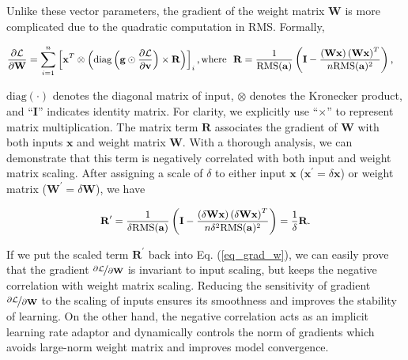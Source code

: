 Unlike these vector parameters, the gradient of the weight matrix $\mathbf{W}$ is more complicated due to the quadratic computation in RMS. Formally,

\begin{align}\label{eq_grad_w}
    \small
    \begin{split}
        & \frac{\partial \mathcal{L}}{\partial \mathbf{W}} =
        \sum_{i=1}^n \left[\mathbf{x}^T \otimes \left(\text{diag}\left(\mathbf{g} \odot \frac{\partial \mathcal{L}}{\partial \mathbf{v}} \right) \times \mathbf{R}\right)\right]_{i},  \text{where}~~ \mathbf{R} = \frac{1}{{\text{RMS}(\mathbf{a})}} \left(\mathbf{I}-\frac{\left(\mathbf{Wx}\right)\left(\mathbf{Wx}\right)^T}{n\text{RMS}(\mathbf{a})^2}\right),
    \end{split}
\end{align}

$\text{diag}(\cdot)$ denotes the diagonal matrix of input, $\otimes$ denotes the Kronecker product, and ``$\mathbf{I}$'' indicates identity matrix. For clarity, we explicitly use ``$\times$'' to represent matrix multiplication. The matrix term $\mathbf{R}$ associates the gradient of $\mathbf{W}$ with both inputs $\mathbf{x}$ and weight matrix $\mathbf{W}$. With a thorough analysis, we can demonstrate that this term is negatively correlated with both input and weight matrix scaling. After assigning a scale of $\delta$ to either input $\mathbf{x}$ ($\mathbf{x}^\prime = \delta \mathbf{x}$) or weight matrix ($\mathbf{W}^\prime = \delta \mathbf{W}$), we have

\begin{equation}
    \small
    \begin{split}
        \mathbf{R}^\prime & = \frac{1}{{\delta \text{RMS}(\mathbf{a})}} \left(\mathbf{I}-\frac{\left(\mathbf{\delta Wx}\right)\left(\mathbf{\delta Wx}\right)^T}{n\delta^2 \text{RMS}(\mathbf{a})^2}\right) = \frac{1}{\delta}\mathbf{R}. \\

    \end{split}
\end{equation}

If we put the scaled term $\mathbf{R}^\prime$ back into Eq. (\ref{eq_grad_w}), we can easily prove that the gradient $\nicefrac{\partial \mathcal{L}}{\partial \mathbf{W}}$ is invariant to input scaling, but keeps the negative correlation with weight matrix scaling. Reducing the sensitivity of gradient $\nicefrac{\partial \mathcal{L}}{\partial \mathbf{W}}$ to the scaling of inputs ensures its smoothness and improves the stability of learning. On the other hand, the negative correlation acts as an implicit learning rate adaptor and dynamically controls the norm of gradients which avoids large-norm weight matrix and improves model convergence.

